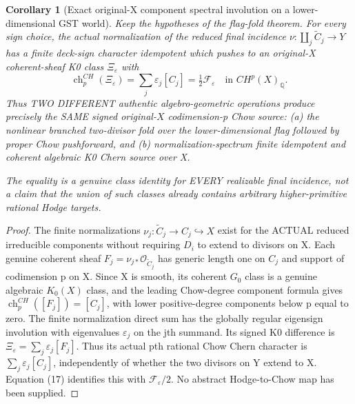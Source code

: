 \documentclass[11pt]{article}
\newtheorem{corollary}{Corollary}
\begin{document}
\begin{corollary}[Exact original-X component spectral involution on a lower-dimensional GST world]
Keep the hypotheses of the flag-fold theorem.
For every sign choice, the actual
normalization of the reduced final
incidence $\nu:\coprod_j\widetilde C_j\to Y$
has a finite deck-sign character
idempotent which pushes to an
original-X coherent-sheaf K0 class
$\Xi_\varepsilon$ with
\[
 \boxed{
 \operatorname{ch}_p^{CH}(\Xi_\varepsilon)
 =\sum_j\varepsilon_j[C_j]
 =\tfrac12\mathcal F_\varepsilon
 \quad\text{in }CH^p(X)_{\mathbb Q}.
 }                                                     \tag{20}
\]
Thus TWO DIFFERENT authentic algebro-geometric
operations produce precisely the SAME
signed original-$X$ codimension-p
Chow source: (a) the nonlinear branched
two-divisor fold over the lower-dimensional
flag followed by proper Chow pushforward,
and (b) normalization-spectrum finite
idempotent and coherent algebraic K0
Chern source over X.

The equality is a genuine class identity
for EVERY realizable final incidence,
not a claim that the union of such classes
already contains arbitrary higher-primitive
rational Hodge targets.
\end{corollary}
\begin{proof}
The finite normalizations
$\nu_j:\widetilde C_j\to C_j\hookrightarrow X$
exist for the ACTUAL reduced irreducible
components without requiring $D_i$ to
extend to divisors on X.
Each genuine coherent sheaf
$F_j=\nu_{j*}\mathcal O_{\widetilde C_j}$
has generic length one on $C_j$
and support of codimension p on X.
Since X is smooth, its coherent
$G_0$ class is a genuine algebraic
$K_0(X)$ class, and the leading
Chow-degree component formula gives
$\operatorname{ch}_p^{CH}([F_j])=[C_j]$,
with lower positive-degree components
below p equal to zero.
The finite normalization direct sum
has the globally regular eigensign
involution with eigenvalues $\varepsilon_j$
on the jth summand. Its signed K0
difference is
$\Xi_\varepsilon=\sum_j\varepsilon_j[F_j]$.
Thus its actual pth rational Chow
Chern character is
$\sum_j\varepsilon_j[C_j]$,
independently of whether the
two divisors on Y extend to X.
Equation (17) identifies this
with $\mathcal F_\varepsilon/2$.
No abstract Hodge-to-Chow
map has been supplied.
\end{proof}
\end{document}
